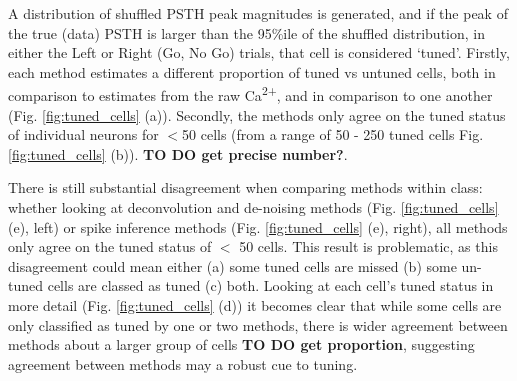 \documentclass[a4paper,10pt,twocolumn]{article}
\begin{document}
A distribution of shuffled PSTH peak magnitudes is generated, and if the peak of the true (data) PSTH is larger than the 95\%ile of the shuffled distribution, in either the Left or Right (Go, No Go) trials, that cell is considered `tuned'.
Firstly, each method estimates a different proportion of tuned vs untuned cells, both in comparison to estimates from the raw Ca\textsuperscript{2+}, and in comparison to one another (Fig. \ref{fig:tuned_cells} (a)). Secondly, the methods only agree on the tuned status of individual neurons for $<$50 cells (from a range of 50 - 250 tuned cells Fig. \ref{fig:tuned_cells} (b)). \textbf{TO DO get precise number?}. 

There is still substantial disagreement when comparing methods within class: whether looking at deconvolution and de-noising methods (Fig. \ref{fig:tuned_cells} (e), left) or spike inference methods (Fig. \ref{fig:tuned_cells} (e), right), all methods only agree on the tuned status of $<$ 50 cells. This result is problematic, as this disagreement could mean either (a) some tuned cells are missed (b) some un-tuned cells are classed as tuned (c) both. Looking at each cell's tuned status in more detail (Fig. \ref{fig:tuned_cells} (d)) it becomes clear that while some cells are only classified as tuned by one or two methods, there is wider agreement between methods about a larger group of cells \textbf{TO DO get proportion}, suggesting agreement between methods may a robust cue to tuning.



\end{document}
